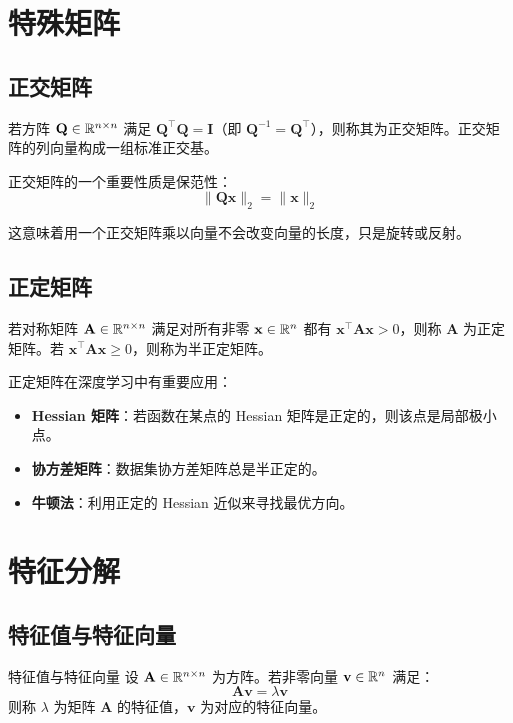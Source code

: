 \section{特殊矩阵}

\subsection{正交矩阵}

若方阵 $\mathbf{Q}\in\mathbb{R}^{n\times n}$ 满足 $\mathbf{Q}^{\top}\mathbf{Q}=\mathbf{I}$（即 $\mathbf{Q}^{-1}=\mathbf{Q}^{\top}$），则称其为正交矩阵。正交矩阵的列向量构成一组标准正交基。

正交矩阵的一个重要性质是保范性：
\[
\|\mathbf{Q}\mathbf{x}\|_2 = \|\mathbf{x}\|_2
\]

这意味着用一个正交矩阵乘以向量不会改变向量的长度，只是旋转或反射。

\subsection{正定矩阵}

若对称矩阵 $\mathbf{A}\in\mathbb{R}^{n\times n}$ 满足对所有非零 $\mathbf{x}\in\mathbb{R}^n$ 都有 $\mathbf{x}^{\top}\mathbf{A}\mathbf{x}>0$，则称 $\mathbf{A}$ 为正定矩阵。若 $\mathbf{x}^{\top}\mathbf{A}\mathbf{x}\geq 0$，则称为半正定矩阵。

正定矩阵在深度学习中有重要应用：
\begin{itemize}
    \item \textbf{Hessian 矩阵}：若函数在某点的 Hessian 矩阵是正定的，则该点是局部极小点。
    \item \textbf{协方差矩阵}：数据集协方差矩阵总是半正定的。
    \item \textbf{牛顿法}：利用正定的 Hessian 近似来寻找最优方向。
\end{itemize}

\section{特征分解}

\subsection{特征值与特征向量}

\begin{myTheorem}{特征值与特征向量}
设 $\mathbf{A}\in\mathbb{R}^{n\times n}$ 为方阵。若非零向量 $\mathbf{v}\in\mathbb{R}^n$ 满足：
\[
\mathbf{A}\mathbf{v} = \lambda \mathbf{v}
\]
则称 $\lambda$ 为矩阵 $\mathbf{A}$ 的特征值，$\mathbf{v}$ 为对应的特征向量。
\end{myTheorem}

